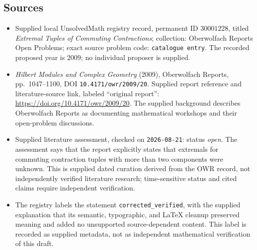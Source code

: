 \documentclass[11pt]{article}
\begin{document}
\subsection{Sources}
\begin{itemize}
\item Supplied local UnsolvedMath registry record, permanent ID \(30001228\), titled \emph{Extremal Tuples of Commuting Contractions}; collection: Oberwolfach Reports Open Problems; exact source problem code: \texttt{catalogue entry}. The recorded proposed year is 2009; no individual proposer is supplied.
\item \emph{Hilbert Modules and Complex Geometry} (2009), Oberwolfach Reports, pp.\ 1047--1100, DOI \texttt{10.4171/owr/2009/20}. Supplied report reference and literature-source link, labeled ``original report'': \url{https://doi.org/10.4171/owr/2009/20}. The supplied background describes Oberwolfach Reports as documenting mathematical workshops and their open-problem discussions.
\item Supplied literature assessment, checked on \texttt{2026-08-21}: status \emph{open}. The assessment says that the report explicitly states that extremals for commuting contraction tuples with more than two components were unknown. This is supplied dated curation derived from the OWR record, not independently verified literature research; time-sensitive status and cited claims require independent verification.
\item The registry labels the statement \texttt{corrected\_verified}, with the supplied explanation that its semantic, typographic, and LaTeX cleanup preserved meaning and added no unsupported source-dependent content. This label is recorded as supplied metadata, not as independent mathematical verification of this draft.
\end{itemize}
\end{document}
